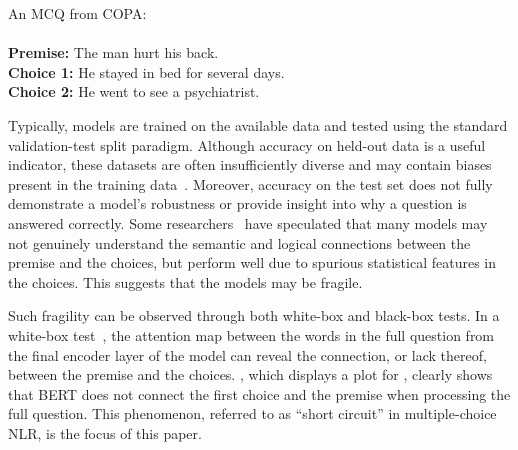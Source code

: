 \begin{example}\label{ex:copa}
An MCQ from COPA:\\ \\
\noindent
\textbf{Premise:} The man hurt his back.\\
\textbf{Choice 1:} He stayed in bed for several days.  \checksymbol \\
\textbf{Choice 2:} He went to see a psychiatrist. \crosssymbol 
\end{example}


Typically, models are trained on the available data and tested 
using the standard validation-test split paradigm. 
Although accuracy on held-out data is a useful indicator, 
these datasets are often insufficiently diverse and may contain 
biases present in the training data~\cite{mccoy2019right}. 
Moreover, accuracy on the test set does not fully demonstrate 
a model's robustness or provide insight into why a question is answered correctly. 
Some researchers~\cite{endingonly1,zellers2018swag,izmailov2022feature} 
have speculated that 
many models may not genuinely understand the semantic and logical 
connections between the premise and the choices, 
but perform well due to spurious statistical features in the choices. 
This suggests that the models may be fragile.

Such fragility can be observed through both white-box 
and black-box tests. In a white-box test~\cite{vig-2019-multiscale}, 
the attention map between the words in the full question 
from the final encoder layer of the model can reveal the connection, 
or lack thereof, between the premise and the choices. 
, which displays a plot for , 
clearly shows that BERT does not connect the first choice 
and the premise when processing the full question. 
This phenomenon, referred to as ``short circuit'' in multiple-choice NLR, 
is the focus of this paper.



